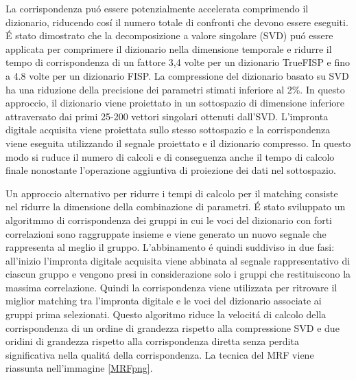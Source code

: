\documentclass[a4paper,12pt]{report}
\begin{document}
 La corrispondenza pu\'o essere potenzialmente accelerata comprimendo il dizionario, riducendo cos\'i il numero totale di confronti che devono essere eseguiti. 
 \'E stato dimostrato che la decomposizione a valore singolare (SVD) pu\'o essere applicata per comprimere il dizionario nella dimensione temporale e ridurre il tempo di corrispondenza di un fattore 3,4 volte per un dizionario TrueFISP e fino a 4.8 volte per un dizionario FISP. 
 La compressione del dizionario basato su SVD ha una riduzione della precisione dei parametri stimati inferiore al 2\%. 
 In questo approccio, il dizionario viene proiettato in un sottospazio di dimensione inferiore attraversato dai primi 25-200 vettori singolari ottenuti dall'SVD. 
 L'impronta digitale acquisita viene proiettata sullo stesso sottospazio e la corrispondenza viene eseguita utilizzando il segnale proiettato e il dizionario compresso. 
 In questo modo si ruduce il numero di calcoli e di conseguenza anche il tempo di calcolo finale nonostante l'operazione aggiuntiva di proiezione dei dati nel sottospazio. 
 
 Un approccio alternativo per ridurre i tempi di calcolo per il matching consiste nel ridurre la dimensione della combinazione di parametri. 
 \'E stato sviluppato un algoritmmo di corrispondenza dei gruppi in cui le voci del dizionario con forti correlazioni sono raggruppate insieme e viene generato un nuovo segnale che rappresenta al meglio il gruppo. 
 L'abbinamento \'e quindi suddiviso in due fasi: all'inizio  l'impronta digitale acquisita viene abbinata al segnale rappresentativo di ciascun gruppo e vengono presi in considerazione solo i gruppi che restituiscono la massima correlazione. 
 Quindi la corrispondenza viene utilizzata per ritrovare il miglior matching tra l'impronta digitale e le voci del dizionario associate ai gruppi prima selezionati. 
 Questo algoritmo riduce la velocit\'a di calcolo della corrispondenza di un ordine di grandezza rispetto alla compressione SVD e due oridini di grandezza rispetto alla corrispondenza diretta senza perdita significativa nella qualit\'a della corrispondenza. 
 La tecnica del MRF viene riassunta nell'immagine \ref{MRFpng}.
 
\end{document}
